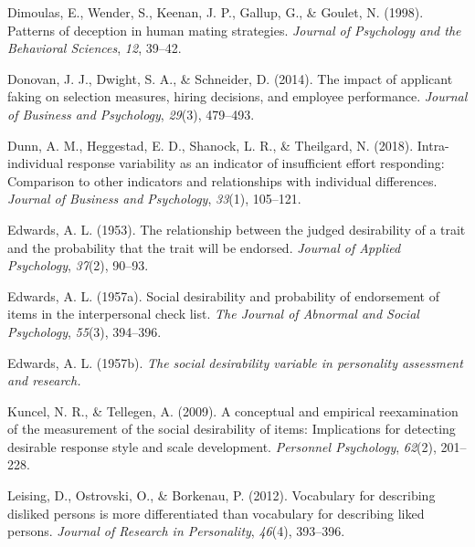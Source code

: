 \documentclass[
  ,jou]{apa6}
\newlength{\cslhangindent}
\newlength{\cslentryspacingunit} %
\newenvironment{CSLReferences}[2] %
 {%
  \setlength{\parindent}{0pt}
  \ifodd #1
  \let\oldpar\par
  \def\par{\hangindent=\cslhangindent\oldpar}
  \fi
  \setlength{\parskip}{#2\cslentryspacingunit}
 }%
 {}
\begin{document}
\begin{CSLReferences}{1}{0}
\leavevmode{}%
Dimoulas, E., Wender, S., Keenan, J. P., Gallup, G., \& Goulet, N. (1998). Patterns of deception in human mating strategies. \emph{Journal of Psychology and the Behavioral Sciences}, \emph{12}, 39--42.

\leavevmode{}%
Donovan, J. J., Dwight, S. A., \& Schneider, D. (2014). The impact of applicant faking on selection measures, hiring decisions, and employee performance. \emph{Journal of Business and Psychology}, \emph{29}(3), 479--493.

\leavevmode{}%
Dunn, A. M., Heggestad, E. D., Shanock, L. R., \& Theilgard, N. (2018). Intra-individual response variability as an indicator of insufficient effort responding: Comparison to other indicators and relationships with individual differences. \emph{Journal of Business and Psychology}, \emph{33}(1), 105--121.

\leavevmode{}%
Edwards, A. L. (1953). The relationship between the judged desirability of a trait and the probability that the trait will be endorsed. \emph{Journal of Applied Psychology}, \emph{37}(2), 90--93.

\leavevmode{}%
Edwards, A. L. (1957a). Social desirability and probability of endorsement of items in the interpersonal check list. \emph{The Journal of Abnormal and Social Psychology}, \emph{55}(3), 394--396.

\leavevmode{}%
Edwards, A. L. (1957b). \emph{The social desirability variable in personality assessment and research.}

\leavevmode{}%
Kuncel, N. R., \& Tellegen, A. (2009). A conceptual and empirical reexamination of the measurement of the social desirability of items: Implications for detecting desirable response style and scale development. \emph{Personnel Psychology}, \emph{62}(2), 201--228.

\leavevmode{}%
Leising, D., Ostrovski, O., \& Borkenau, P. (2012). Vocabulary for describing disliked persons is more differentiated than vocabulary for describing liked persons. \emph{Journal of Research in Personality}, \emph{46}(4), 393--396.


\end{CSLReferences}
\end{document}
